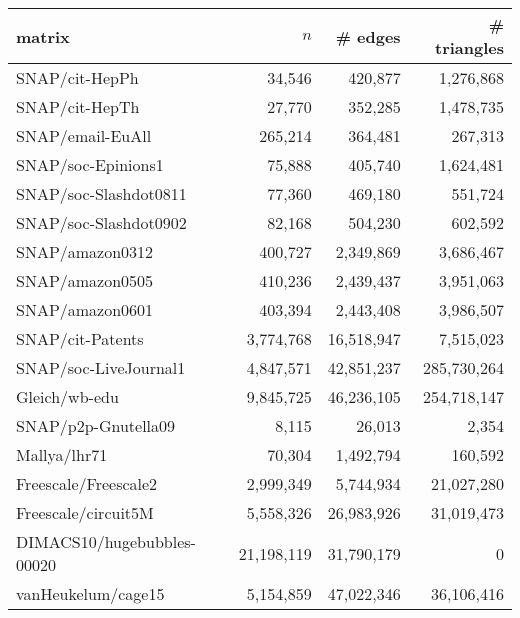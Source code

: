 \documentclass[12pt]{article}
\begin{document}
{\footnotesize
\begin{tabular}{|lrrr|}
\hline
matrix & $n$  & \# edges & \# triangles \\
\hline
SNAP/cit-HepPh & 34,546 & 420,877 & 1,276,868 \\
SNAP/cit-HepTh & 27,770 & 352,285 & 1,478,735 \\
SNAP/email-EuAll & 265,214 & 364,481 & 267,313 \\
SNAP/soc-Epinions1 & 75,888 & 405,740 & 1,624,481 \\
SNAP/soc-Slashdot0811 & 77,360 & 469,180 & 551,724 \\
SNAP/soc-Slashdot0902 & 82,168 & 504,230 & 602,592 \\
SNAP/amazon0312 & 400,727 & 2,349,869 & 3,686,467 \\
SNAP/amazon0505 & 410,236 & 2,439,437 & 3,951,063 \\
SNAP/amazon0601 & 403,394 & 2,443,408 & 3,986,507 \\
SNAP/cit-Patents & 3,774,768 & 16,518,947 & 7,515,023 \\
SNAP/soc-LiveJournal1 & 4,847,571 & 42,851,237 & 285,730,264 \\
Gleich/wb-edu & 9,845,725 & 46,236,105 & 254,718,147 \\
\hline
SNAP/p2p-Gnutella09 & 8,115 & 26,013 & 2,354 \\
Mallya/lhr71 & 70,304 & 1,492,794 & 160,592 \\
Freescale/Freescale2 & 2,999,349 & 5,744,934 & 21,027,280 \\
Freescale/circuit5M & 5,558,326 & 26,983,926 & 31,019,473 \\
DIMACS10/hugebubbles-00020 & 21,198,119 & 31,790,179 & 0 \\
vanHeukelum/cage15 & 5,154,859 & 47,022,346 & 36,106,416 \\
\hline
\end{tabular}
}

\vspace{0.5in}
\end{document}
